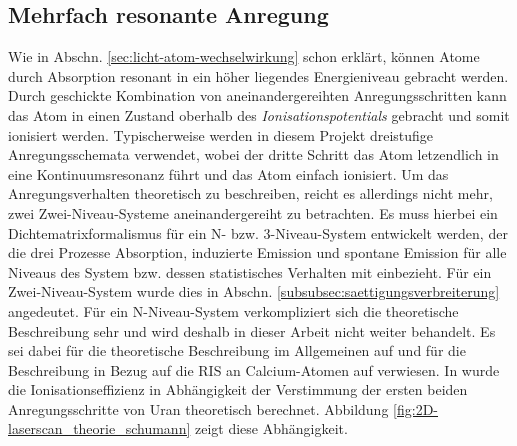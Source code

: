 \subsection{Mehrfach
resonante Anregung}\label{subsec:mehrfach_resonante_anregung}
Wie in Abschn. \ref{sec:licht-atom-wechselwirkung} schon erklärt, können Atome
durch Absorption resonant in ein höher liegendes Energieniveau gebracht werden.
Durch geschickte Kombination von aneinandergereihten Anregungsschritten kann
das Atom in einen Zustand oberhalb des \textit{Ionisationspotentials} gebracht
und somit ionisiert werden. Typischerweise werden in diesem Projekt dreistufige
Anregungsschemata verwendet, wobei der dritte Schritt das Atom letzendlich in
eine Kontinuumsresonanz führt und das Atom einfach ionisiert. Um das
Anregungsverhalten theoretisch zu beschreiben, reicht es allerdings nicht mehr,
zwei Zwei-Niveau-Systeme aneinandergereiht zu betrachten. Es muss hierbei ein
Dichtematrixformalismus für ein N- bzw. 3-Niveau-System entwickelt werden, der
die drei Prozesse Absorption, induzierte Emission und spontane Emission für alle
Niveaus des System bzw. dessen statistisches Verhalten mit einbezieht. Für ein
Zwei-Niveau-System wurde dies in Abschn. 
\ref{subsubsec:saettigungsverbreiterung} angedeutet. Für ein N-Niveau-System
verkompliziert sich die theoretische Beschreibung sehr und wird deshalb in
dieser Arbeit nicht weiter behandelt. Es sei dabei für die theoretische
Beschreibung im Allgemeinen auf \cite{blum:density_matrix_theory} und für die
Beschreibung in Bezug auf die RIS an Calcium-Atomen auf
\cite{noertershaeuser:1999:dissertation} verwiesen. In
\cite{schumann:2005:dissertation} wurde die Ionisationseffizienz in Abhängigkeit
der Verstimmung der ersten beiden Anregungsschritte von Uran theoretisch
berechnet. Abbildung \ref{fig:2D-laserscan_theorie_schumann} zeigt diese
Abhängigkeit.

